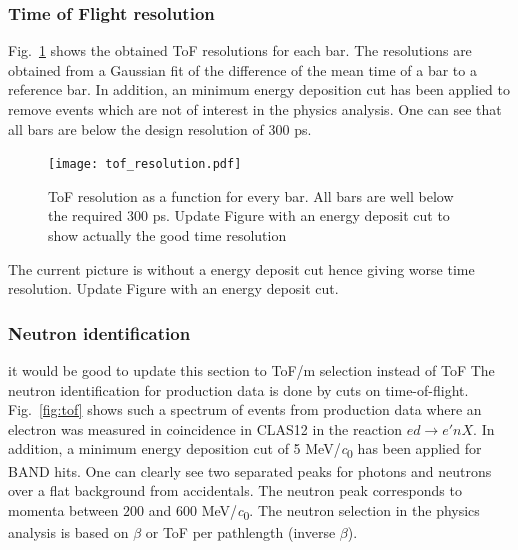 \documentclass[3p,final,twocolumn]{elsarticle}
\begin{document}
{\subsubsection{Time of Flight resolution}
Fig.~\ref{fig:tof_resolution} shows the obtained ToF resolutions for each bar. The resolutions are obtained from a Gaussian fit of the difference of the mean time of a bar to a reference bar.
In addition, an minimum energy deposition cut has been applied to remove events which are not of interest in the physics analysis. One can see that all bars are below the design resolution of
300 \si{\pico\s}. 
\begin{figure}[h!]
	\centering
		\texttt{[image: tof\_resolution.pdf]}
	\caption{ToF resolution as a function for every bar. All bars are well below the required 300 \si{\pico\s}. {\color{red} Update Figure with an energy deposit cut to show actually the good time resolution}}
	\label{fig:tof_resolution}
\end{figure}

{\color{red} The current picture is without a energy deposit cut hence giving worse time resolution. Update Figure with an energy deposit cut.}

\subsubsection{Neutron identification}
{\color{red} it would be good to update this section to ToF/m selection instead of ToF}
The neutron identification for production data is done by cuts on time-of-flight. Fig.~\ref{fig:tof} shows such a spectrum of events from production data where an electron was measured in coincidence in CLAS12 in the reaction $ed \rightarrow e'nX$. In addition, a minimum energy deposition cut of 5 \si{\MeV/\clight} has been applied for BAND hits. One can clearly see two separated peaks for photons and neutrons over a flat background from accidentals. The neutron peak corresponds to momenta between $200$ and $600$ \si{\MeV/\clight}.
The neutron selection in the physics analysis is based on $\beta$ or ToF per pathlength (inverse $\beta$).

}
\end{document}
